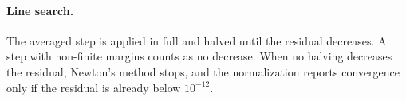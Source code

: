 \documentclass[11pt]{article}
\begin{document}
\paragraph{Line search.} The averaged step is applied in full and halved until
the residual decreases. A step with non-finite margins counts as no decrease.
When no halving decreases the residual, Newton's method stops, and the
normalization reports convergence only if the residual is already below
$10^{-12}$.
\end{document}
